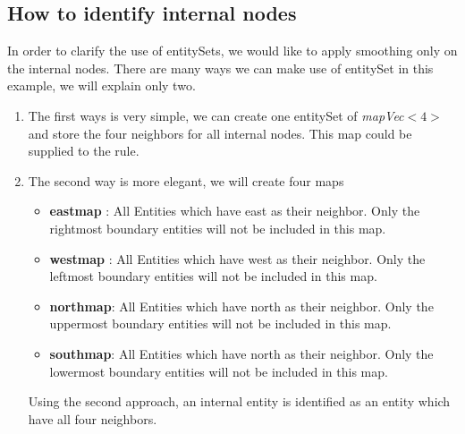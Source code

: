 \subsection { How to identify internal nodes }

In order to clarify the use of entitySets, we would like to apply smoothing
only on the internal nodes. There are many ways we can make use of entitySet
in this example, we will explain only two.  

\begin{enumerate}
\item  The first ways is very simple, we can create one entitySet of 
{\em mapVec$<4>$} and store the four neighbors for all internal nodes. This
map could be supplied to the rule.
\item The second way is more elegant, we will create four maps 
\begin{itemize}
\item {\bf eastmap} :  All Entities which have east as their neighbor. Only the
rightmost boundary entities will not be included in this map.
\item {\bf westmap} :  All Entities which have west as their neighbor. Only the
leftmost boundary entities will not be included in this map.
\item {\bf northmap}:  All Entities which have north as their neighbor. Only the
uppermost boundary entities will not be included in this map.
\item {\bf southmap}:  All Entities which have north as their neighbor. Only the
lowermost boundary entities will not be included in this map.
\end{itemize}
\par Using the second approach, an internal entity is identified as an entity
which have all four neighbors. 
\end{enumerate}
               

